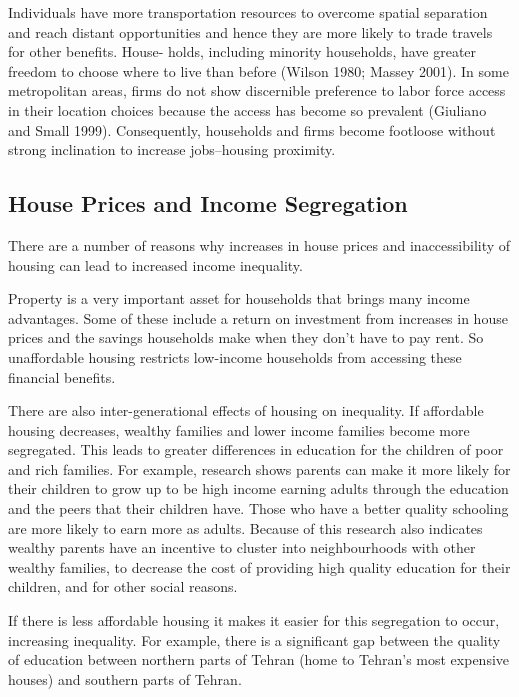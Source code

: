 Individuals have more transportation resources to overcome spatial separation and reach distant opportunities and hence they are more likely to trade travels for other benefits. House- holds, including minority households, have greater freedom to choose where to live than before (Wilson 1980; Massey 2001). In some metropolitan areas, firms do not show discernible preference to labor force access in their location choices because the access has become so prevalent (Giuliano and Small 1999). Consequently, households and firms become footloose without strong inclination to increase jobs–housing proximity. 

\citep{ewing2002measuring,ewing2016does}

\subsection{House Prices and Income Segregation}
There are a number of reasons why increases in house prices and inaccessibility of housing can lead to increased income inequality.

Property is a very important asset for households that brings many income advantages. Some of these include a return on investment from increases in house prices and the savings households make when they don’t have to pay rent. So unaffordable housing restricts low-income households from accessing these financial benefits.

There are also inter-generational effects of housing on inequality. If affordable housing decreases, wealthy families and lower income families become more segregated. This leads to greater differences in education for the children of poor and rich families. For example, research shows parents can make it more likely for their children to grow up to be high income earning adults through the education and the peers that their children have. Those who have a better quality schooling are more likely to earn more as adults. Because of this research also indicates wealthy parents have an incentive to cluster into neighbourhoods with other wealthy families, to decrease the cost of providing high quality education for their children, and for other social reasons.

If there is less affordable housing it makes it easier for this segregation to occur, increasing inequality. For example, there is a significant gap between the quality of education between northern parts of Tehran (home to Tehran’s most expensive houses) and southern parts of Tehran.

